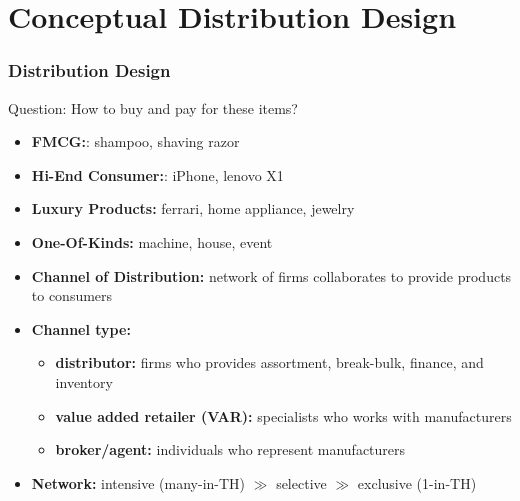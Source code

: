 \documentclass[10pt,handout,notes=show]{beamer}
\begin{document}
\section[Distribution]{Conceptual Distribution Design }
\begin{frame}
  \frametitle{Distribution Design}

  \begin{center} \small{
  \begin{block}{Question: How to buy and pay for these items? }{}
    \begin{itemize}
      \item \textbf{FMCG:}: shampoo, shaving razor \hfill {}
      \item \textbf{Hi-End Consumer:}: iPhone, lenovo X1 \hfill {}
      \item \textbf{Luxury Products:} ferrari, home appliance, jewelry
      \item \textbf{One-Of-Kinds:} machine, house, event
    \end{itemize}
  \end{block} }
  \end{center}


  \begin{itemize}
    \item \textbf{Channel of Distribution:} network of firms collaborates to provide products to consumers
    \item \textbf{Channel type:}
    \begin{itemize}
      \item \textbf{distributor:} \alert{firms} who provides assortment, break-bulk, finance, and inventory
      \item \textbf{value added retailer (VAR):} \alert{specialists} who works with manufacturers
      \item \textbf{broker/agent:} \alert{individuals} who represent manufacturers  \NextHalfLine
    \end{itemize}
    \item \textbf{Network:} intensive (many-in-TH) $\gg$ selective $\gg$ exclusive (1-in-TH)
  \end{itemize}


\end{frame}
\end{document}
